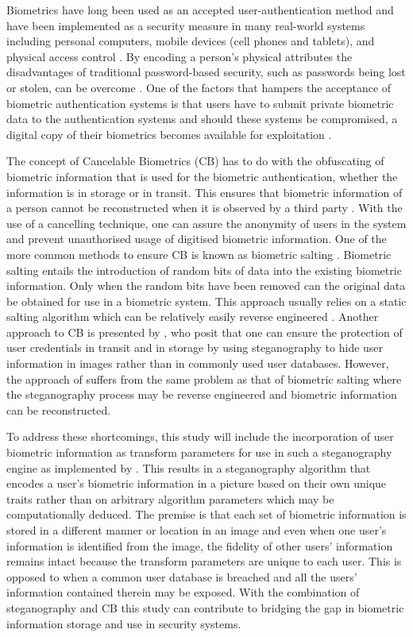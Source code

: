 Biometrics have long been used as an accepted user-authentication method and have been implemented as a security measure in many real-world systems including personal computers, mobile devices (cell phones and tablets), and physical access control \citep{Liu2001}. By encoding a person’s physical attributes the disadvantages of traditional password-based security, such as passwords being lost or stolen, can be overcome \citep{Jain2016}. One of the factors that hampers the acceptance of biometric authentication systems is that users have to submit private biometric data to the authentication systems and should these systems be compromised, a digital copy of their biometrics becomes available for exploitation \citep{Rathgeb2011}.

The concept of Cancelable Biometrics (CB) has to do with the obfuscating of biometric information that is used for the biometric authentication, whether the information is in storage or in transit. This ensures that biometric information of a person cannot be reconstructed when it is observed by a third party \citep{Shahim2016}. With the use of a cancelling technique, one can assure the anonymity of users in the system and prevent unauthorised usage of digitised biometric information. One of the more common methods to ensure CB is known as biometric salting \citep{Rathgeb2011}. Biometric salting entails the introduction of random bits of data into the existing biometric information. Only when the random bits have been removed can the original data be obtained for use in a biometric system. This approach usually relies on a static salting algorithm which can be relatively easily reverse engineered \citep{Shahim2016}. Another approach to CB is presented by \cite{Dlamini2016}, who posit that one can ensure the protection of user credentials in transit and in storage by using steganography to hide user information in images rather than in commonly used user databases. However, the approach of \cite{Dlamini2016} suffers from the same problem as that of biometric salting where the steganography process may be reverse engineered and biometric information can be reconstructed. 

To address these shortcomings, this study will include the incorporation of user biometric information as transform parameters for use in such a steganography engine as implemented by \cite{Dlamini2016}. This results in a steganography algorithm that encodes a user’s biometric information in a picture based on their own unique traits rather than on arbitrary algorithm parameters which may be computationally deduced. The premise is that each set of biometric information is stored in a different manner or location in an image and even when one user’s information is identified from the image, the fidelity of other users’ information remains intact because the transform parameters are unique to each user. This is opposed to when a common user database is breached and all the users’ information contained therein may be exposed. With the combination of steganography and CB this study can contribute to bridging the gap in biometric information storage and use in security systems.

